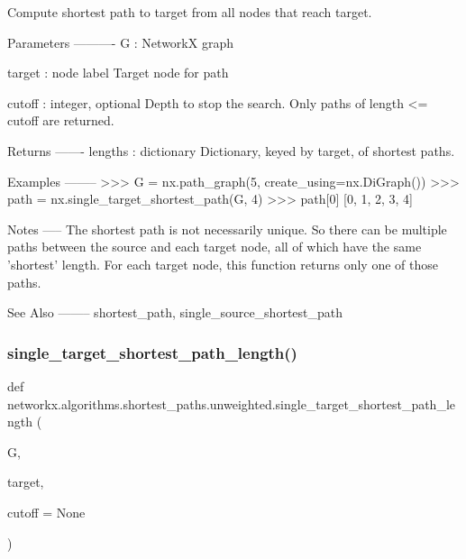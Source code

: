 \begin{DoxyVerb}Compute shortest path to target from all nodes that reach target.

Parameters
----------
G : NetworkX graph

target : node label
   Target node for path

cutoff : integer, optional
    Depth to stop the search. Only paths of length <= cutoff are returned.

Returns
-------
lengths : dictionary
    Dictionary, keyed by target, of shortest paths.

Examples
--------
>>> G = nx.path_graph(5, create_using=nx.DiGraph())
>>> path = nx.single_target_shortest_path(G, 4)
>>> path[0]
[0, 1, 2, 3, 4]

Notes
-----
The shortest path is not necessarily unique. So there can be multiple
paths between the source and each target node, all of which have the
same 'shortest' length. For each target node, this function returns
only one of those paths.

See Also
--------
shortest_path, single_source_shortest_path
\end{DoxyVerb}
 \mbox{\label{namespacenetworkx_1_1algorithms_1_1shortest__paths_1_1unweighted_a0e5fa6d9513e007e37df23b6d53bedbb}} 
\subsubsection{\texorpdfstring{single\+\_\+target\+\_\+shortest\+\_\+path\+\_\+length()}{single\_target\_shortest\_path\_length()}}
{\footnotesize\ttfamily def networkx.\+algorithms.\+shortest\+\_\+paths.\+unweighted.\+single\+\_\+target\+\_\+shortest\+\_\+path\+\_\+length (\begin{DoxyParamCaption}\item[{}]{G,  }\item[{}]{target,  }\item[{}]{cutoff = {\ttfamily None} }\end{DoxyParamCaption})}

